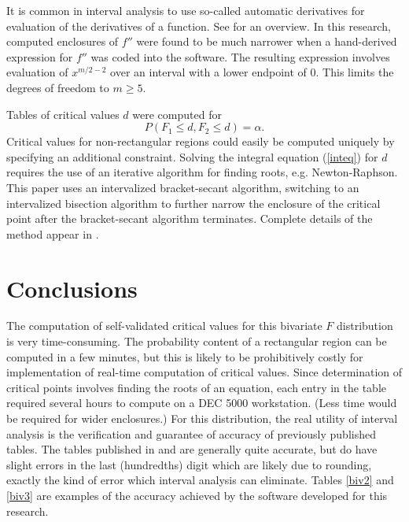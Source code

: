  It is common in interval analysis to use so-called automatic derivatives for
evaluation of the derivatives of a function.  See \cite{Moore79} for an
overview.  In this research, computed enclosures of $f''$ were found to be
much narrower when a hand-derived expression for $f''$ was coded into the
software.  The
resulting expression involves evaluation of $x^{m/2-2}$ over an interval with
a lower endpoint of $0$.  This limits the degrees of freedom to
$m \geq 5$.

Tables of critical values $d$ were computed for 
\begin{equation}
P(F_1 \leq d, F_2 \leq d) = \alpha.
\label{inteq}
\end{equation}
Critical values for non-rectangular
regions could easily be computed uniquely by specifying an additional
constraint.  Solving the integral equation (\ref{inteq}) for $d$ requires the use of an
iterative algorithm for finding roots, e.g. Newton-Raphson.  This paper uses
an intervalized bracket-secant algorithm, switching to an intervalized
bisection algorithm to further narrow the enclosure of the critical point
after the bracket-secant algorithm terminates.  Complete details of the method
appear in \cite{WrightChi}.

\section{Conclusions}

The computation of self-validated 
critical values for this bivariate $F$ distribution is very
time-consuming.  
The probability content of a rectangular region can be computed
in a few minutes, but this is likely to be prohibitively costly for  
implementation of real-time computation of critical values.    
Since determination of critical points involves finding the roots of an
equation, each entry in the table required several hours to compute on a DEC 5000
workstation.  (Less time would be required for wider enclosures.) 
For this distribution, the real utility of
interval analysis is the verification and guarantee of accuracy 
of previously published tables.  The tables published in \cite{Krishnaiah75} and 
\cite{Krishnaiah80} are generally quite accurate, but do have slight errors in
the last (hundredths) digit which are likely due to rounding, exactly the kind
of error which interval analysis can eliminate.  Tables \ref{biv2} and
\ref{biv3} are examples of the accuracy achieved by the software developed for
this research.

